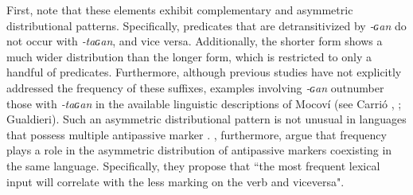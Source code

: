 \documentclass[12pt]{article}
\begin{document}
First, note that these elements exhibit complementary and asymmetric distributional patterns. Specifically, predicates that are detransitivized by \textit{‑ɢan} do not occur with \textit{‑taɢan}, and vice versa. Additionally, the shorter form shows a much wider distribution than the longer form, which is restricted to only a handful of predicates. Furthermore, although previous studies have not explicitly addressed the frequency of these suffixes, examples involving \textit{‑ɢan} outnumber those with \textit{‑taɢan} in the available linguistic descriptions of Mocoví (see Carrió \citeyear{Carrio2015a}, \citeyear{Carrio2015}; Gualdieri\citeyear{gualdieri1998}). Such an asymmetric distributional pattern is not unusual in languages that possess multiple antipassive marker \citep[see, for instance,][]{say2021,janic.witzlack-makarevich2021}. \citet[][]{serzant.etal2021}, furthermore, argue that frequency plays a role in the asymmetric distribution of antipassive markers coexisting in the same language. Specifically, they propose that ``the most frequent lexical input will correlate with the less marking on the verb and viceversa".   
\end{document}

